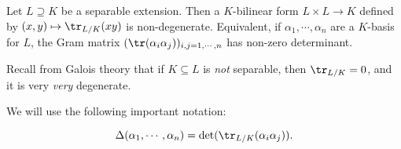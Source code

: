 \documentclass[a4paper]{article}
\begin{document}
\begin{prop}
  Let $L\supseteq K$ be a separable extension. Then a $K$-bilinear form $L \times L \to K$ defined by $(x, y) \mapsto \tr_{L/K}(xy)$ is non-degenerate. Equivalent, if $\alpha_1,\cdots, \alpha_n$ are a $K$-basis for $L$, the Gram matrix $(\tr(\alpha_i\alpha_j))_{i, j = 1, \cdots, n}$ has non-zero determinant.
\end{prop}
Recall from Galois theory that if $K \subseteq L$ is \emph{not} separable, then $\tr_{L/K} = 0$, and it is very \emph{very} degenerate.

We will use the following important notation:
\begin{notation}
  \[
    \Delta(\alpha_1, \cdots, \alpha_n) = \det(\tr_{L/K}(\alpha_i \alpha_j)).
  \]
\end{notation}
\end{document}
